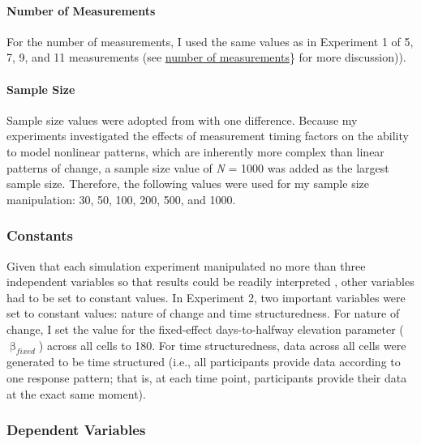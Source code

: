 \documentclass[
12pt, %
twoside,
english]{guelphthesis}
\begin{document}
\hypertarget{number-of-measurements-1}{%
\paragraph{Number of Measurements}\label{number-of-measurements-1}}

For the number of measurements, I used the same values as in Experiment 1 of 5, 7, 9, and 11 measurements (see \protect\hyperlink{number-measurements}{number of measurements}\} for more discussion)).

\hypertarget{sample-size}{%
\paragraph{Sample Size}\label{sample-size}}

Sample size values were adopted from \textcite{coulombe2016} with one difference.
Because my experiments investigated the effects of measurement timing
factors on the ability to model nonlinear patterns, which are inherently
more complex than linear patterns of change, a sample size value of \emph{N}
= 1000 was added as the largest sample size. Therefore, the following
values were used for my sample size manipulation: 30, 50, 100, 200, 500,
and 1000.

\hypertarget{constants-exp2}{%
\subsubsection{Constants}\label{constants-exp2}}

Given that each simulation experiment manipulated no more than three independent variables so that results could be readily interpreted \autocite{halford2005}, other variables had to be set to constant values. In Experiment 2, two important variables were set to constant values: nature of change and time structuredness. For nature of change, I set the value for the fixed-effect days-to-halfway elevation parameter (\(\upbeta_{fixed}\)) across all cells to 180. For time structuredness, data across all cells were generated to be time structured (i.e., all participants provide data according to one response pattern; that is, at each time point, participants provide their data at the exact same moment).

\hypertarget{dependent-variables-1}{%
\subsubsection{Dependent Variables}\label{dependent-variables-1}}
\end{document}
